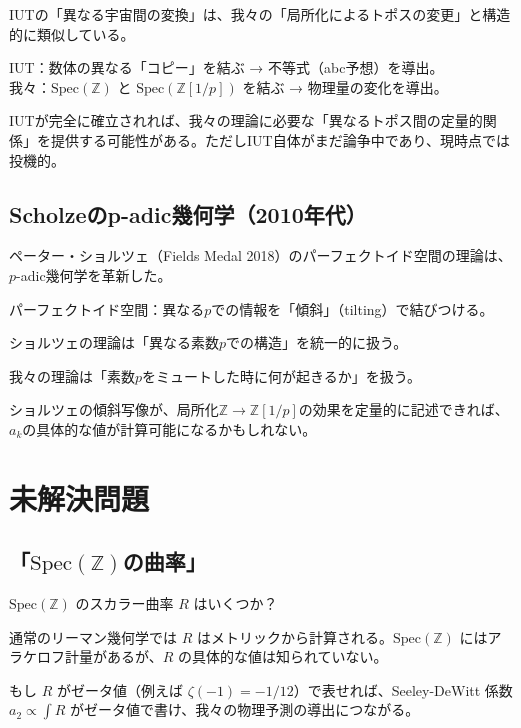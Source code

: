 \documentclass[12pt,a4paper]{article}
\newcommand{\Spec}{\mathrm{Spec}}
\begin{document}
\begin{storybox}[我々の理論との可能な接続]
IUTの「異なる宇宙間の変換」は、我々の「局所化によるトポスの変更」と構造的に類似している。

IUT：数体の異なる「コピー」を結ぶ → 不等式（abc予想）を導出。\\
我々：$\Spec(\mathbb{Z})$ と $\Spec(\mathbb{Z}[1/p])$ を結ぶ → 物理量の変化を導出。

IUTが完全に確立されれば、我々の理論に必要な「異なるトポス間の定量的関係」を提供する可能性がある。ただしIUT自体がまだ論争中であり、現時点では投機的。
\end{storybox}

\subsection{Scholzeのp-adic幾何学（2010年代）}

ペーター・ショルツェ（Fields Medal 2018）のパーフェクトイド空間の理論は、$p$-adic幾何学を革新した。

パーフェクトイド空間：異なる$p$での情報を「傾斜」（tilting）で結びつける。

\begin{deepbox}[我々の理論との接続]
ショルツェの理論は「異なる素数$p$での構造」を統一的に扱う。

我々の理論は「素数$p$をミュートした時に何が起きるか」を扱う。

ショルツェの傾斜写像が、局所化$\mathbb{Z} \to \mathbb{Z}[1/p]$の効果を定量的に記述できれば、$a_k$の具体的な値が計算可能になるかもしれない。
\end{deepbox}

\section{未解決問題}

\subsection{「$\Spec(\mathbb{Z})$の曲率」}

\begin{mathbox}[核心的未解決問題]
$\Spec(\mathbb{Z})$ のスカラー曲率 $R$ はいくつか？

通常のリーマン幾何学では $R$ はメトリックから計算される。$\Spec(\mathbb{Z})$ にはアラケロフ計量があるが、$R$ の具体的な値は知られていない。

もし $R$ がゼータ値（例えば $\zeta(-1) = -1/12$）で表せれば、Seeley-DeWitt 係数 $a_2 \propto \int R$ がゼータ値で書け、我々の物理予測の導出につながる。
\end{mathbox}
\end{document}
